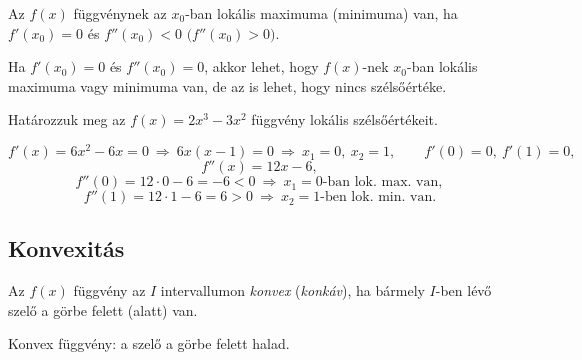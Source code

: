 \documentclass[11pt]{article}
\begin{document}
\begin{thmbox}
\begin{theorem}
Az $f(x)$ függvénynek az $x_{0}$-ban lokális maximuma (minimuma) van, ha $f'(x_{0})=0$ és $f''(x_{0})<0$ $\bigl(f''(x_{0})>0\bigr)$.
\end{theorem}
\end{thmbox}

\begin{remark}
Ha $f'(x_{0})=0$ és $f''(x_{0})=0$, akkor lehet, hogy $f(x)$-nek $x_{0}$-ban lokális maximuma vagy minimuma van, de az is lehet, hogy nincs szélsőértéke.
\end{remark}

\begin{exbox}
\begin{example}
Határozzuk meg az $f(x)=2x^{3}-3x^{2}$ függvény lokális szélsőértékeit.
\end{example}
\end{exbox}
\begin{solution}
\[
f'(x)=6x^{2}-6x=0\ \Longrightarrow\ 6x(x-1)=0\ \Longrightarrow\ x_{1}=0,\ x_{2}=1,\qquad f'(0)=0,\ f'(1)=0,
\]
\[
f''(x)=12x-6,
\]
\[
f''(0)=12\cdot 0-6=-6<0\ \Longrightarrow\ x_{1}=0\text{-ban lok.\ max.\ van},
\]
\[
f''(1)=12\cdot 1-6=6>0\ \Longrightarrow\ x_{2}=1\text{-ben lok.\ min.\ van}.
\]
\end{solution}

\subsection{Konvexitás}

\begin{defbox}
\begin{definition}[Konvexitás]
Az $f(x)$ függvény az $I$ intervallumon \emph{konvex} (\emph{konkáv}), ha bármely $I$-ben lévő szelő a görbe felett (alatt) van.
\end{definition}
\end{defbox}

\begin{notefig}{Konvex függvény: a szelő a görbe felett halad.}
\end{notefig}
\end{document}
